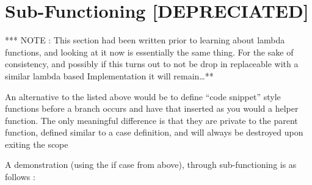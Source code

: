 \documentclass{article}
\newcommand{\clfootnote}[3]{\color{#2}{\footnote{\label{#1}{ \color{#2}{#3}}}}\color{defaultcolor}}
\begin{document}
    \newpage
    \section{Sub-Functioning [DEPRECIATED]}

        *** NOTE : This section had been written prior to learning about lambda functions, and looking at it now is essentially the same thing. For the sake of consistency, and possibly if this turns out to not be drop in replaceable with a similar lambda based Implementation it will remain\dots ***

    \bigskip
        An alternative to the listed above would be to define ``code snippet'' style functions before a branch occurs and have that inserted as you would a helper function. The only meaningful difference is that they are private to the parent function, defined similar to a case definition, and will always be destroyed upon exiting the scope \clfootnote{SFunctionDestructionNote}{red}{This includes forbidding that function from being passed out of scope, this can be justified due to that use-case necessitating the creation of a public function already defined of scope NOT a sub-function within THIS scope\dots}

    \bigskip
        A demonstration (using the if case from above), through sub-functioning is as follows \clfootnote{SFunctionCompilerNote}{blue}{interestingly enough this ``should'' compile exactly like the above example with the sub-function acting as an alias for the compiler to swap the logic with, the exception being that shared then branches will ALSO need sub-functions that can be input into those localities, which removes the nesting seen in the above pre-compilation solution}:
    
\end{document}
